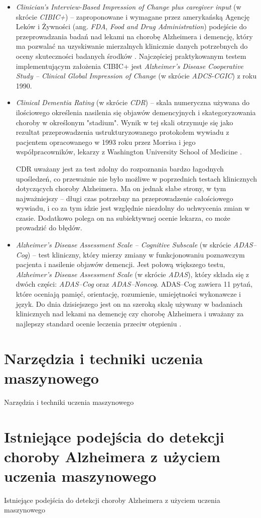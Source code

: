 \begin{itemize}
  \item \emph{Clinician's Interview-Based Impression of Change plus caregiver input} (w skrócie \emph{CIBIC+}) -- zaproponowane i wymagane przez amerykańską Agencję Leków i Żywności (ang. \emph{FDA}, \emph{Food and Drug Administration}) podejście do przeprowadzania badań nad lekami na chorobę Alzheimera i demencję, który ma pozwalać na uzyskiwanie mierzalnych klinicznie danych potrzebnych do oceny skuteczności badanych środków \cite{joffres2000qualitative}.
        Najczęściej praktykowanym testem implementującym założenia CIBIC+ jest \emph{Alzheimer's Disease Cooperative Study -- Clinical Global Impression of Change} (w skrócie \emph{ADCS-CGIC}) z roku 1990.

  \item \emph{Clinical Dementia Rating} (w skrócie \emph{CDR}) -- skala numeryczna używana do ilościowego określenia nasilenia się objawów demencyjnych i skategoryzowania choroby w określonym "stadium".
        Wynik w tej skali otrzymuje się jako rezultat przeprowadzenia ustrukturyzowanego protokołem wywiadu z pacjentem opracowanego w 1993 roku przez Morrisa i jego współpracowników, lekarzy z Washington University School of Medicine \cite{morris1993clinical}.

        CDR uważany jest za test zdolny do rozpoznania bardzo łagodnych upośledzeń, co przeważnie nie było możliwe w poprzednich testach klinicznych dotyczących choroby Alzheimera.
        Ma on jednak słabe strony, w tym najważniejszy -- długi czas potrzebny na przeprowadzenie całościowego wywiadu, i co za tym idzie jest względnie niezdolny do uchwycenia zmian w czasie.
        Dodatkowo polega on na subiektywnej ocenie lekarza, co może prowadzić do błędów.

  \item \emph{Alzheimer's Disease Assessment Scale -- Cognitive Subscale} (w skrócie \emph{ADAS--Cog}) -- test kliniczny, który mierzy zmiany w funkcjonowaniu poznawczym pacjenta i nasilenie objawów demencji.
        Jest połową większego testu, \emph{Alzheimer's Disease Assessment Scale} (w skrócie \emph{ADAS}), który składa się z dwóch części: \emph{ADAS--Cog} oraz \emph{ADAS--Noncog}.
        ADAS--Cog zawiera 11 pytań, które oceniają pamięć, orientację, rozumienie, umiejętności wykonawcze i język.
        Do dnia dzisiejszego jest on na szeroką skalę używany w badaniach klinicznych nad lekami na demencję czy chorobę Alzheimera i uważany za najlepszy standard  ocenie leczenia przeciw otępieniu \cite{connor2008administration}.

\end{itemize}

\section{Narzędzia i techniki uczenia maszynowego}

Narzędzia i techniki uczenia maszynowego

\section{Istniejące podejścia do detekcji choroby Alzheimera z użyciem uczenia maszynowego}

Istniejące podejścia do detekcji choroby Alzheimera z użyciem uczenia maszynowego
